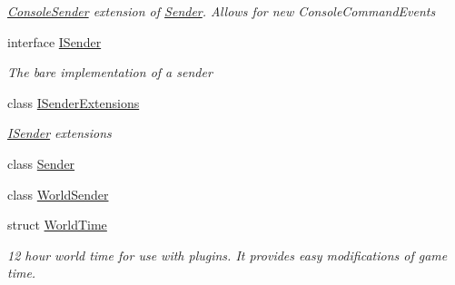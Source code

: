 \begin{DoxyCompactItemize}
\begin{DoxyCompactList}\small\item\em \hyperlink{classOTA_1_1Command_1_1ConsoleSender}{Console\+Sender} extension of \hyperlink{classOTA_1_1Command_1_1Sender}{Sender}. Allows for new Console\+Command\+Events \end{DoxyCompactList}\item 
interface \hyperlink{interfaceOTA_1_1Command_1_1ISender}{I\+Sender}
\begin{DoxyCompactList}\small\item\em The bare implementation of a sender \end{DoxyCompactList}\item 
class \hyperlink{classOTA_1_1Command_1_1ISenderExtensions}{I\+Sender\+Extensions}
\begin{DoxyCompactList}\small\item\em \hyperlink{interfaceOTA_1_1Command_1_1ISender}{I\+Sender} extensions \end{DoxyCompactList}\item 
class \hyperlink{classOTA_1_1Command_1_1Sender}{Sender}
\item 
class \hyperlink{classOTA_1_1Command_1_1WorldSender}{World\+Sender}
\item 
struct \hyperlink{structOTA_1_1Command_1_1WorldTime}{World\+Time}
\begin{DoxyCompactList}\small\item\em 12 hour world time for use with plugins. It provides easy modifications of game time. \end{DoxyCompactList}\end{DoxyCompactItemize}
